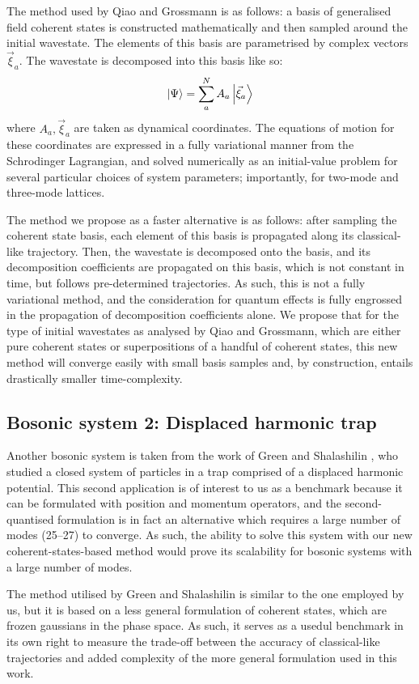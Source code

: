 The method used by Qiao and Grossmann is as follows: a basis of generalised field coherent states is constructed mathematically and then sampled around the initial wavestate. The elements of this basis are parametrised by complex vectors $\vec{\xi}_a$. The wavestate is decomposed into this basis like so:
\begin{equation}
\ket{\Psi}=\sum_a^N A_a\ket{\vec{\xi}_a}
\end{equation}
where $A_a, \vec{\xi}_a$ are taken as dynamical coordinates. The equations of motion for these coordinates are expressed in a fully variational manner from the Schrodinger Lagrangian, and solved numerically as an initial-value problem for several particular choices of system parameters; importantly, for two-mode and three-mode lattices.

The method we propose as a faster alternative is as follows: after sampling the coherent state basis, each element of this basis is propagated along its classical-like trajectory. Then, the wavestate is decomposed onto the basis, and its decomposition coefficients are propagated on this basis, which is not constant in time, but follows pre-determined trajectories. As such, this is not a fully variational method, and the consideration for quantum effects is fully engrossed in the propagation of decomposition coefficients alone. We propose that for the type of initial wavestates as analysed by Qiao and Grossmann, which are either pure coherent states or superpositions of a handful of coherent states, this new method will converge easily with small basis samples and, by construction, entails drastically smaller time-complexity.
	
\subsection{Bosonic system 2: Displaced harmonic trap} \label{sec:bosonic2}
Another bosonic system is taken from the work of Green and Shalashilin \cite{green}, who studied a closed system of particles in a trap comprised of a displaced harmonic potential. This second application is of interest to us as a benchmark because it can be formulated with position and momentum operators, and the second-quantised formulation is in fact an alternative which requires a large number of modes (25--27) to converge. As such, the ability to solve this system with our new coherent-states-based method would prove its scalability for bosonic systems with a large number of modes.

The method utilised by Green and Shalashilin is similar to the one employed by us, but it is based on a less general formulation of coherent states, which are frozen gaussians in the phase space. As such, it serves as a usedul benchmark in its own right to measure the trade-off between the accuracy of classical-like trajectories and added complexity of the more general formulation used in this work.
	
